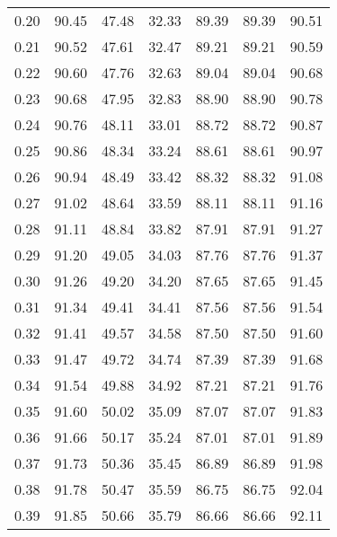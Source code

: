 \begin{tabular}{|c|c|c|c|c|c|c|}
      0.20 &     90.45 &     47.48 &      32.33 &   89.39 &      89.39 &         90.51 \\
      0.21 &     90.52 &     47.61 &      32.47 &   89.21 &      89.21 &         90.59 \\
      0.22 &     90.60 &     47.76 &      32.63 &   89.04 &      89.04 &         90.68 \\
      0.23 &     90.68 &     47.95 &      32.83 &   88.90 &      88.90 &         90.78 \\
      0.24 &     90.76 &     48.11 &      33.01 &   88.72 &      88.72 &         90.87 \\
      0.25 &     90.86 &     48.34 &      33.24 &   88.61 &      88.61 &         90.97 \\
      0.26 &     90.94 &     48.49 &      33.42 &   88.32 &      88.32 &         91.08 \\
      0.27 &     91.02 &     48.64 &      33.59 &   88.11 &      88.11 &         91.16 \\
      0.28 &     91.11 &     48.84 &      33.82 &   87.91 &      87.91 &         91.27 \\
      0.29 &     91.20 &     49.05 &      34.03 &   87.76 &      87.76 &         91.37 \\
      0.30 &     91.26 &     49.20 &      34.20 &   87.65 &      87.65 &         91.45 \\
      0.31 &     91.34 &     49.41 &      34.41 &   87.56 &      87.56 &         91.54 \\
      0.32 &     91.41 &     49.57 &      34.58 &   87.50 &      87.50 &         91.60 \\
      0.33 &     91.47 &     49.72 &      34.74 &   87.39 &      87.39 &         91.68 \\
      0.34 &     91.54 &     49.88 &      34.92 &   87.21 &      87.21 &         91.76 \\
      0.35 &     91.60 &     50.02 &      35.09 &   87.07 &      87.07 &         91.83 \\
      0.36 &     91.66 &     50.17 &      35.24 &   87.01 &      87.01 &         91.89 \\
      0.37 &     91.73 &     50.36 &      35.45 &   86.89 &      86.89 &         91.98 \\
      0.38 &     91.78 &     50.47 &      35.59 &   86.75 &      86.75 &         92.04 \\
      0.39 &     91.85 &     50.66 &      35.79 &   86.66 &      86.66 &         92.11 \\

\end{tabular}
